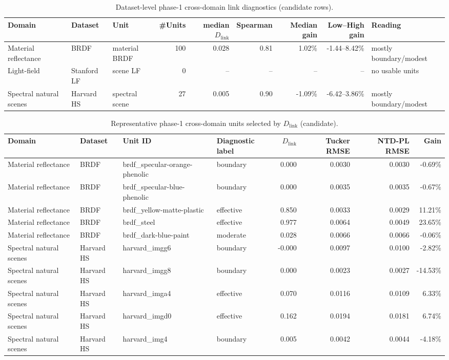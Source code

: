
\begin{table}[t]
\centering
\caption{Dataset-level phase-1 cross-domain link diagnostics (candidate rows).}
\begin{tabular}{@{}l l l r r r r r l@{}}
\toprule
Domain & Dataset & Unit & \#Units & median $D_{\mathrm{link}}$ & Spearman & Median gain & Low--High gain & Reading \\
\midrule
Material reflectance & BRDF & material BRDF & 100 & 0.028 & 0.81 & 1.02\% & -1.44--8.42\% & mostly boundary/modest \\
Light-field & Stanford LF & scene LF & 0 & -- & -- & -- & -- & no usable units \\
Spectral natural scenes & Harvard HS & spectral scene & 27 & 0.005 & 0.90 & -1.09\% & -6.42--3.86\% & mostly boundary/modest \\
\bottomrule
\end{tabular}
\end{table}

\begin{table}[t]
\centering
\caption{Representative phase-1 cross-domain units selected by $D_{\mathrm{link}}$ (candidate).}
\begin{tabular}{@{}l l l l r r r r@{}}
\toprule
Domain & Dataset & Unit ID & Diagnostic label & $D_{\mathrm{link}}$ & Tucker RMSE & NTD-PL RMSE & Gain \\
\midrule
Material reflectance & BRDF & brdf_specular-orange-phenolic & boundary & 0.000 & 0.0030 & 0.0030 & -0.69\% \\
Material reflectance & BRDF & brdf_specular-blue-phenolic & boundary & 0.000 & 0.0035 & 0.0035 & -0.67\% \\
Material reflectance & BRDF & brdf_yellow-matte-plastic & effective & 0.850 & 0.0033 & 0.0029 & 11.21\% \\
Material reflectance & BRDF & brdf_steel & effective & 0.977 & 0.0064 & 0.0049 & 23.65\% \\
Material reflectance & BRDF & brdf_dark-blue-paint & moderate & 0.028 & 0.0066 & 0.0066 & -0.06\% \\
Spectral natural scenes & Harvard HS & harvard_imgg6 & boundary & -0.000 & 0.0097 & 0.0100 & -2.82\% \\
Spectral natural scenes & Harvard HS & harvard_imgg8 & boundary & 0.000 & 0.0023 & 0.0027 & -14.53\% \\
Spectral natural scenes & Harvard HS & harvard_imga4 & effective & 0.070 & 0.0116 & 0.0109 & 6.33\% \\
Spectral natural scenes & Harvard HS & harvard_imgd0 & effective & 0.162 & 0.0194 & 0.0181 & 6.74\% \\
Spectral natural scenes & Harvard HS & harvard_img4 & boundary & 0.005 & 0.0042 & 0.0044 & -4.18\% \\
\bottomrule
\end{tabular}
\end{table}
